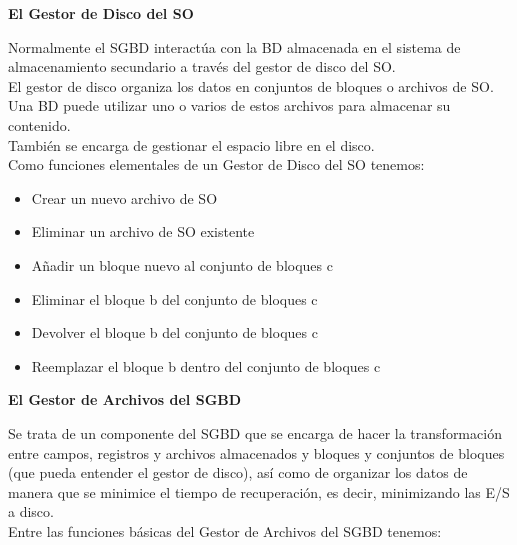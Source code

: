 \documentclass[a4paper,11pt]{article}
\begin{document}
\textbf{El Gestor de Disco del SO}

Normalmente el SGBD interactúa con la BD almacenada en el sistema de almacenamiento secundario a través del gestor de disco del SO. \\

El gestor de disco organiza los datos en conjuntos de bloques o archivos de SO. Una BD puede utilizar uno o varios de estos archivos para almacenar su contenido. \\

También se encarga de gestionar el espacio libre en el disco. \\

Como funciones elementales de un Gestor de Disco del SO tenemos:

\begin{itemize}
\item Crear un nuevo archivo de SO
\item Eliminar un archivo de SO existente
\item Añadir un bloque nuevo al conjunto de bloques c
\item Eliminar el bloque b del conjunto de bloques c
\item Devolver el bloque b del conjunto de bloques c
\item Reemplazar el bloque b dentro del conjunto de bloques c
\end{itemize}

\textbf{El Gestor de Archivos del SGBD}

Se trata de un componente del SGBD que se encarga de hacer la transformación entre campos, registros y archivos almacenados y bloques y conjuntos de bloques (que pueda entender el gestor de disco), así como de organizar los datos de manera que se minimice el tiempo de recuperación, es decir, minimizando las E/S a disco. \\

Entre las funciones básicas del Gestor de Archivos del SGBD tenemos:
\end{document}
